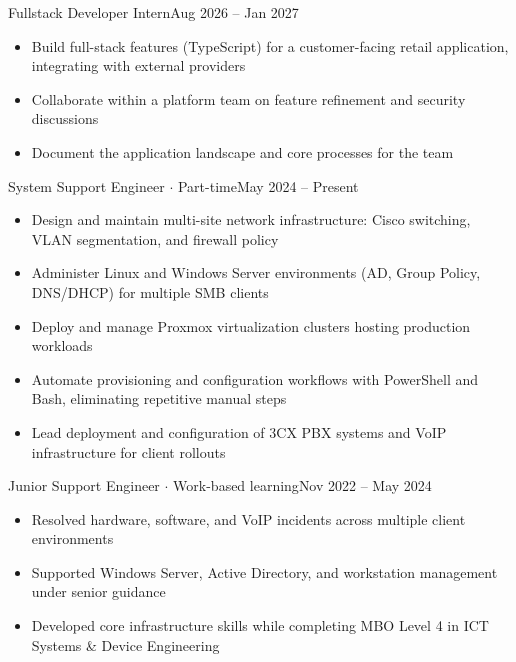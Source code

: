 \documentclass[a4paper,10pt]{article}
\begin{document}
%
        {Fullstack Developer Intern}{Aug 2026 -- Jan 2027}
\begin{itemize}
  \item Build full-stack features (TypeScript) for a customer-facing retail application, integrating with external providers
  \item Collaborate within a platform team on feature refinement and security discussions
  \item Document the application landscape and core processes for the team
\end{itemize}

\vspace{1pt}

%
        {System Support Engineer $\cdot$ Part-time}{May 2024 -- Present}
\begin{itemize}
  \item Design and maintain multi-site network infrastructure: Cisco switching, VLAN segmentation, and firewall policy
  \item Administer Linux and Windows Server environments (AD, Group Policy, DNS/DHCP) for multiple SMB clients
  \item Deploy and manage Proxmox virtualization clusters hosting production workloads
  \item Automate provisioning and configuration workflows with PowerShell and Bash, eliminating repetitive manual steps
  \item Lead deployment and configuration of 3CX PBX systems and VoIP infrastructure for client rollouts
\end{itemize}

\vspace{1pt}

%
        {Junior Support Engineer $\cdot$ Work-based learning}{Nov 2022 -- May 2024}
\begin{itemize}
  \item Resolved hardware, software, and VoIP incidents across multiple client environments
  \item Supported Windows Server, Active Directory, and workstation management under senior guidance
  \item Developed core infrastructure skills while completing MBO Level 4 in ICT Systems \& Device Engineering
\end{itemize}
\end{document}

